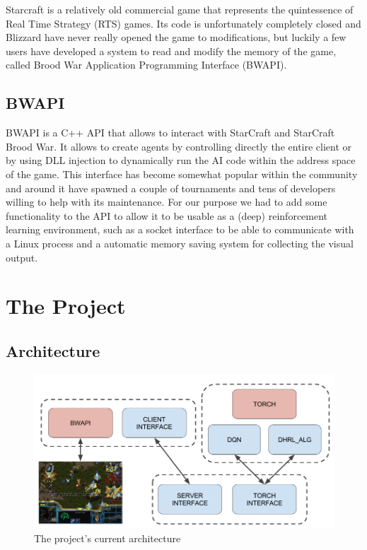 \documentclass[bsc,frontabs,twoside,parskip,deptreport]{infthesis}     %
\begin{document}
Starcraft is a relatively old commercial game that represents the quintessence
of Real Time Strategy (RTS) games. Its code is unfortunately completely closed
and Blizzard have never really opened the game to modifications, but luckily a
few users have developed a system to read and modify the memory of the game,
called Brood War Application Programming Interface (BWAPI)\cite{bwapi2011brood}.

\section{BWAPI}

BWAPI is a C++ API that allows to interact with StarCraft and StarCraft Brood
War. It allows to create agents by controlling directly the entire client or by
using DLL injection to dynamically run the AI code within the address space of
the game. This interface has become somewhat popular within the community and
around it have spawned a couple of tournaments and tens of developers willing to
help with its maintenance. For our purpose we had to add some functionality to
the API to allow it to be usable as a (deep) reinforcement learning environment,
such as a socket interface to be able to communicate with a Linux process and a
automatic memory saving system for collecting the visual output.

\chapter{The Project}

\section{Architecture}

\begin{figure}[h]
    \centering
    \includegraphics[width=\textwidth]{architecture}
    \caption{The project's current architecture}
    \label{fig:arch}
\end{figure}
\end{document}

